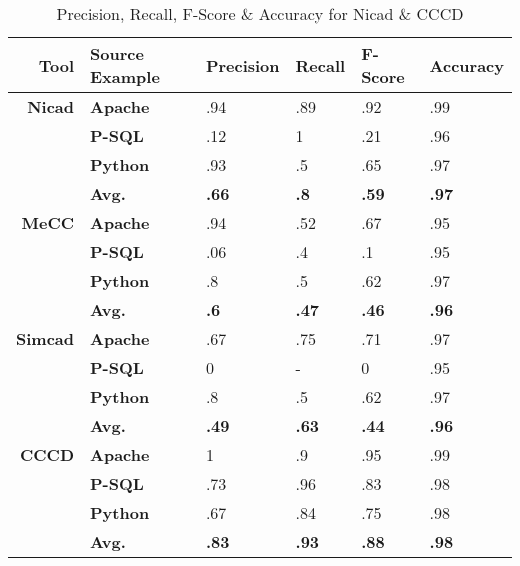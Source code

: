 \documentclass[smallextended]{svjour3}       %
\begin{document}
\begin{table}[thb!]

\begin{center}
\caption{Precision, Recall, F-Score \& Accuracy for Nicad \& CCCD}
\label{Table:precisionrecall}
\begin{tabular}{r||l|l|l|l|l}
\bfseries Tool & \bfseries Source Example & \bfseries Precision & \bfseries Recall & \bfseries F-Score & \bfseries Accuracy \\ \hline\hline
  \bfseries Nicad & \bfseries Apache & .94 & .89 & .92 & .99   \\ \cline{2-6}
& \bfseries P-SQL & .12 & 1 & .21 & .96 \\ \cline{2-6}
& \bfseries Python & .93 & .5 & .65 & .97 \\ \cline{2-6}
& \bfseries Avg. & \bfseries .66 & \bfseries .8 & \bfseries .59 & \bfseries .97 \\ \cline{2-6}
 \hline \hline
\bfseries MeCC & \bfseries Apache & .94 & .52 & .67 & .95   \\ \cline{2-6}
& \bfseries P-SQL & .06 & .4 & .1 & .95 \\ \cline{2-6}
& \bfseries Python & .8 & .5 & .62 & .97 \\ \cline{2-6}
& \bfseries Avg. & \bfseries .6 & \bfseries .47 & \bfseries .46 & \bfseries .96 \\ \cline{2-6}
 \hline \hline
\bfseries Simcad & \bfseries Apache & .67 & .75 & .71 & .97   \\ \cline{2-6}
& \bfseries P-SQL & 0 & - & 0 & .95 \\ \cline{2-6}
& \bfseries Python & .8 & .5 & .62 & .97 \\ \cline{2-6}
& \bfseries Avg. & \bfseries .49 & \bfseries .63 & \bfseries .44 & \bfseries .96 \\ \cline{2-6}
 \hline \hline
\bfseries CCCD & \bfseries Apache & 1 & .9 & .95 & .99 \\ \cline{2-6}
& \bfseries P-SQL & .73 & .96 & .83 & .98 \\ \cline{2-6}
& \bfseries Python & .67 & .84 & .75 & .98 \\ \cline{2-6}
& \bfseries Avg. & \bfseries .83 & \bfseries .93 & \bfseries .88 & \bfseries .98 \\ \cline{2-6}
 \hline %

\end{tabular}

\end{center}
\end{table}
\end{document}
